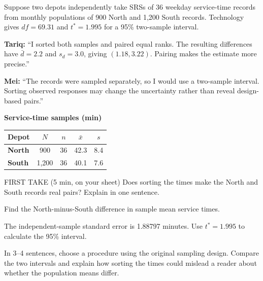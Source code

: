 \documentclass[14pt]{extarticle}
\begin{document}
\pagestyle{empty}


\noindent\begin{minipage}[t]{0.57\linewidth}
\vspace{0pt}
Suppose two depots independently take SRSs of 36 weekday service-time records from monthly populations of 900 North and 1,200 South records. Technology gives $df=69.31$ and $t^*=1.995$ for a 95\% two-sample interval.\par\smallskip \textbf{Tariq:} ``I sorted both samples and paired equal ranks. The resulting differences have $\bar d=2.2$ and $s_d=3.0$, giving $(1.18,3.22)$. Pairing makes the estimate more precise.''\par \textbf{Mei:} ``The records were sampled separately, so I would use a two-sample interval. Sorting observed responses may change the uncertainty rather than reveal design-based pairs.''\par
\end{minipage}\hfill
\begin{minipage}[t]{0.40\linewidth}
\vspace{0pt}
\begin{center}
\textbf{Service-time samples (min)}\par\smallskip
\begin{tabular}{|l|c|c|c|c|}
\hline
\textbf{Depot} & \textbf{$N$} & \textbf{$n$} & \textbf{$\bar x$} & \textbf{$s$} \\ \hline
\textbf{North} & 900 & 36 & 42.3 & 8.4 \\ \hline
\textbf{South} & 1,200 & 36 & 40.1 & 7.6 \\ \hline
\end{tabular}
\end{center}
\end{minipage}

\begin{firsttakebox}{FIRST TAKE (5 min, on your sheet)}
Does sorting the times make the North and South records real pairs? Explain in one sentence.
\end{firsttakebox}

\begin{description}[leftmargin=1.15in, labelwidth=1in, itemsep=2pt, topsep=2pt]
  \item[\dokbadge{1}~(a)] Find the North-minus-South difference in sample mean service times.
  \item[\dokbadge{2}~(b)] The independent-sample standard error is 1.88797 minutes. Use $t^*=1.995$ to calculate the 95\% interval.
  \item[\dokbadge{3}~(c)] In 3--4 sentences, choose a procedure using the original sampling design. Compare the two intervals and explain how sorting the times could mislead a reader about whether the population means differ.
\end{description}
\end{document}
